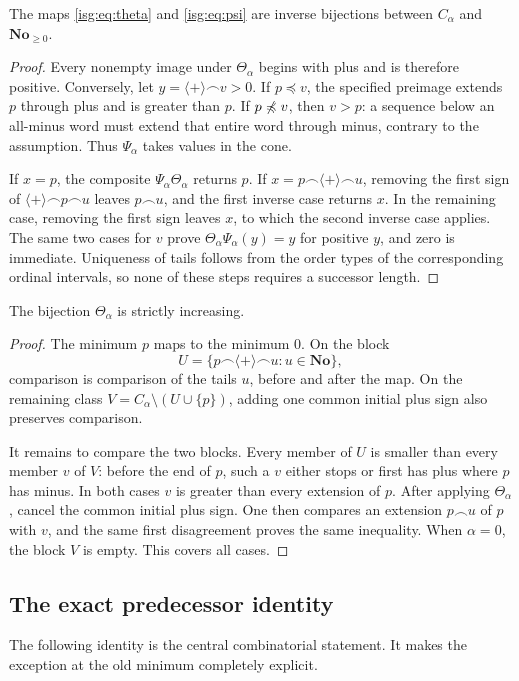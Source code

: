 \documentclass[11pt]{article}
\theoremstyle{definition}
\theoremstyle{remark}
\newcommand{\No}{\ensuremath{\mathbf{No}}}
\newcommand{\cat}{\mathbin{\frown}}
\newcommand{\plus}{\langle+\rangle}
\newcommand{\pre}{\mathrel{\preccurlyeq}}
\newcommand{\tht}{\Theta_{\alpha}}
\newcommand{\psiA}{\Psi_{\alpha}}
\begin{document}
\begin{lemma}\label{isg:lem:inverse}
The maps \eqref{isg:eq:theta} and \eqref{isg:eq:psi} are inverse bijections
between $C_\alpha$ and $\No_{\ge0}$.
\end{lemma}
\begin{proof}
Every nonempty image under $\tht$ begins with plus and is therefore
positive. Conversely, let $y=\plus\cat v>0$. If $p\pre v$, the
specified preimage extends $p$ through plus and is greater than $p$.
If $p\not\pre v$, then $v>p$: a sequence below an all-minus word must
extend that entire word through minus, contrary to the assumption.
Thus $\psiA$ takes values in the cone.

If $x=p$, the composite $\psiA\tht$ returns $p$. If
$x=p\cat\plus\cat u$, removing the first sign of
$\plus\cat p\cat u$ leaves $p\cat u$, and the first inverse case
returns $x$. In the remaining case, removing the first sign leaves
$x$, to which the second inverse case applies. The same two cases for
$v$ prove $\tht\psiA(y)=y$ for positive $y$, and zero is immediate.
Uniqueness of tails follows from the order types of the corresponding
ordinal intervals, so none of these steps requires a successor length.
\end{proof}

\begin{lemma}\label{isg:lem:thetaorder}
The bijection $\tht$ is strictly increasing.
\end{lemma}
\begin{proof}
The minimum $p$ maps to the minimum $0$. On the block
\[
 U=\{p\cat\plus\cat u:u\in\No\},
\]
comparison is comparison of the tails $u$, before and after the map.
On the remaining class $V=C_\alpha\setminus(U\cup\{p\})$, adding
one common initial plus sign also preserves comparison.

It remains to compare the two blocks. Every member of $U$ is smaller
than every member $v$ of $V$: before the end of $p$, such a $v$ either
stops or first has plus where $p$ has minus. In both cases $v$ is greater
than every extension of $p$. After applying $\tht$, cancel the common
initial plus sign. One then compares an extension $p\cat u$ of $p$
with $v$, and the same first disagreement proves the same inequality.
When $\alpha=0$, the block $V$ is empty. This covers all cases.
\end{proof}

\subsection{The exact predecessor identity}
The following identity is the central combinatorial statement.
It makes the exception at the old minimum completely explicit.
\end{document}
